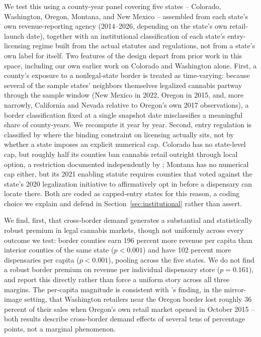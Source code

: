 \documentclass[12pt]{article}
\begin{document}
We test this using a county-year panel covering five states -- Colorado, Washington, Oregon, Montana, and New
Mexico -- assembled from each state's own revenue-reporting agency (2014--2026, depending on the state's own
retail-launch date), together with an institutional classification of each state's entry-licensing regime built
from the actual statutes and regulations, not from a state's own label for itself. Two features of the design
depart from prior work in this space, including our own earlier work on Colorado and Washington alone. First,
a county's exposure to a nonlegal-state border is treated as time-varying: because several of the sample
states' neighbors themselves legalized cannabis partway through the sample window (New Mexico in 2022, Oregon
in 2015, and, more narrowly, California and Nevada relative to Oregon's own 2017 observations), a border
classification fixed at a single snapshot date misclassifies a meaningful share of county-years. We recompute
it year by year. Second, entry regulation is classified by where the binding constraint on licensing actually
sits, not by whether a state imposes an explicit numerical cap. Colorado has no state-level cap, but roughly
half its counties ban cannabis retail outright through local option, a restriction documented independently by
\citet{PayanBrownSong2021}; Montana has no numerical cap either, but its 2021 enabling statute requires
counties that voted against the state's 2020 legalization initiative to affirmatively opt in before a
dispensary can locate there. Both are coded as capped-entry states for this reason, a coding choice we explain
and defend in Section~\ref{sec:institutional} rather than assert.

We find, first, that cross-border demand generates a substantial and statistically robust premium in legal
cannabis markets, though not uniformly across every outcome we test: border counties earn 196 percent more
revenue per capita than interior counties of the same state ($p<0.001$) and have 102 percent more dispensaries
per capita ($p<0.001$), pooling across the five states. We do not find a robust border premium on revenue per
individual dispensary store ($p=0.161$), and report this directly rather than force a uniform story across all
three margins. The per-capita magnitude is consistent with \citet{HansenMillerWeber2020}'s finding, in the
mirror-image setting, that Washington retailers near the Oregon border lost roughly 36 percent of their sales
when Oregon's own retail market opened in October 2015 -- both results describe cross-border demand effects of
several tens of percentage points, not a marginal phenomenon.
\end{document}
